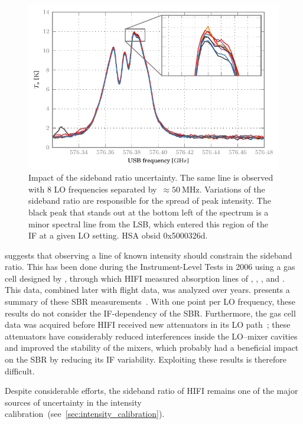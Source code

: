\begin{figure}
    \centering
    \includegraphics{sbr_effect}
    \caption{
        Impact of the sideband ratio uncertainty.
        The same line is observed with 8 LO frequencies separated by~$\approx \SI{50}{\mega\hertz}$.
        Variations of the sideband ratio are responsible for the spread of peak intensity.
        The black peak that stands out at the bottom left of the spectrum is a minor spectral line from the LSB, which entered this region of the IF at a given LO setting.
        HSA obsid 0x5000326d.
    }
    \label{fig:sbr_effect}
\end{figure}

 suggests that observing a line of known intensity should constrain the sideband ratio.
This has been done during the Instrument-Level Tests in 2006 using a gas cell designed by \textcite{teyssier2004multi}, through which HIFI measured absorption lines of , , ,  and .
This data, combined later with flight data, was analyzed over years.
 presents a summary of these SBR measurements~\parencite{higgins2010calibration,higgins2014effect}.
With one point per LO frequency, these results do not consider the IF-dependency of the SBR.
Furthermore, the gas cell data was acquired before HIFI received new attenuators in its LO path~\parencite{jellema2008flight}; these attenuators have considerably reduced interferences inside the LO--mixer cavities and improved the stability of the mixers, which probably had a beneficial impact on the SBR by reducing its IF variability.
Exploiting these results is therefore difficult.

Despite considerable efforts, the sideband ratio of HIFI remains one of the major sources of uncertainty in the intensity calibration~(see~\cref{sec:intensity_calibration}).

